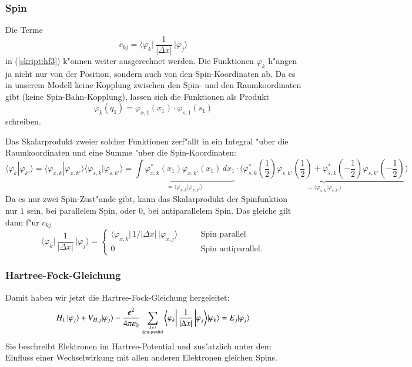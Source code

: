 \subsubsection{Spin}
Die Terme
\[
c_{kj}
=
\biggl\langle\varphi_k\biggl|\,
\frac{1}{|\Delta x|}
\,\biggr|\varphi_j\biggr\rangle
\]
in (\ref{skript:hf3})  k"onnen weiter ausgerechnet werden.
Die Funktionen $\varphi_k$ h"angen ja nicht nur von der Position, sondern
auch von den Spin-Koordinaten ab.
Da es in unserem Modell keine Kopplung zwischen den Spin- und
den Raumkoordinaten gibt (keine Spin-Bahn-Kopplung), lassen sich die
Funktionen als Produkt
\[
\varphi_k(q_1)=\varphi_{x,1}(x_1)\cdot\varphi_{s,1}(s_1)
\]
schreiben.

Das Skalarprodukt zweier solcher Funktionen zerf"allt in ein Integral
"uber die Raumkoordinaten und eine Summe "uber die Spin-Koordinaten:
\[
\langle\varphi_k|\varphi_{k'}\rangle
=
\langle\varphi_{x,k}|\varphi_{x,k'}\rangle
\langle\varphi_{s,k}|\varphi_{s,k'}\rangle
=
\underbrace{
\int\varphi_{x,k}^*(x_1)\varphi_{x,k'}(x_1)\,dx_1
}_{=\langle\varphi_{x,k}|\varphi_{x,k'}\rangle}
\cdot
\big(
\underbrace{
\varphi_{s,k}^*(\textstyle \frac12) \varphi_{s,k'}(\textstyle \frac12)
+
\varphi_{s,k}^*(\textstyle-\frac12) \varphi_{s,k'}(\textstyle-\frac12)
}_{=\langle\varphi_{s,k}|\varphi_{s,k'}\rangle}
\big)
\]
Da es nur zwei Spin-Zust"ande gibt, kann das Skalarprodukt der Spinfunktion
nur $1$ sein, bei parallelem Spin, oder $0$, bei antiparallelem Spin.
Das gleiche gilt dann f"ur  $c_{kj}$
\[
\biggl\langle\varphi_k\biggl|\,
\frac{1}{|\Delta x|}
\,\biggr|\varphi_j\biggr\rangle
=
\begin{cases}
\langle\varphi_{x,k}|\, 1/|\Delta x|\,|\varphi_{x,j}\rangle
&\qquad\text{Spin parallel}
\\
0&\qquad\text{Spin antiparallel}.
\end{cases}
\]

\subsubsection{Hartree-Fock-Gleichung}
Damit haben wir jetzt die Hartree-Fock-Gleichung hergeleitet:
\begin{align}
H_1\,|\varphi_j\rangle
+
V_{H,j}
|\varphi_j\rangle
-
\frac{e^2}{4\pi\varepsilon_0}
\sum_{{k\ne j}\atop{\text{Spin parallel}}}
\biggl\langle\varphi_k\biggl|\,
\frac{1}{|\Delta x|}
\,\biggr|\varphi_j\biggr\rangle
|\varphi_k\rangle
=
E_j
| \varphi_j\rangle
\label{skript:hf4}
\end{align}
Sie beschreibt Elektronen im Hartree-Potential und zus"atzlich unter
dem Einfluss einer Wechselwirkung mit allen anderen Elektronen
gleichen Spins.



